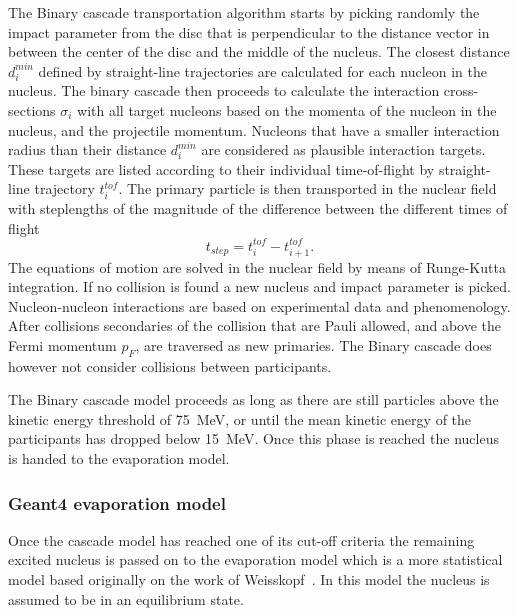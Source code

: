 The Binary cascade transportation algorithm starts by picking randomly the impact parameter from the disc that is perpendicular to the distance vector in between the center of the disc and the middle of the nucleus. The closest distance $d^{min}_{i}$ defined by straight-line trajectories are calculated for each nucleon in the nucleus. The binary cascade then proceeds to calculate the interaction cross-sections $\sigma_i$ with all target nucleons based on the momenta of the nucleon in the nucleus, and the projectile momentum. Nucleons that have a smaller interaction radius than their distance $d^{min}_{i}$ are considered as plausible interaction targets. These targets are listed according to their individual time-of-flight by straight-line trajectory $t^{tof}_i$. The primary particle is then transported in the nuclear field with steplengths of the magnitude of the difference between the different times of flight \begin{equation}t_{step} = t^{tof}_i - t^{tof}_{i+1}.\end{equation}The equations of motion are solved in the nuclear field by means of Runge-Kutta integration. If no collision is found a new nucleus and impact parameter is picked.
Nucleon-nucleon interactions are based on experimental data and phenomenology. After collisions secondaries of the collision that are Pauli allowed, and above the Fermi momentum $p_F$, are traversed as new primaries. The Binary cascade does however not consider collisions between participants.

The Binary cascade model proceeds as long as there are still particles above the kinetic energy threshold  of 75~MeV, or until the mean kinetic energy of the participants has dropped below 15~MeV. Once this phase is reached the nucleus is handed to the evaporation model.

\subsubsection{Geant4 evaporation model}

Once the cascade model has reached one of its cut-off criteria the remaining excited nucleus is passed on to the evaporation model which is a more statistical model based originally on the work of Weisskopf~\cite{Weisskopf}. In this model the nucleus is assumed to be in an equilibrium state.


